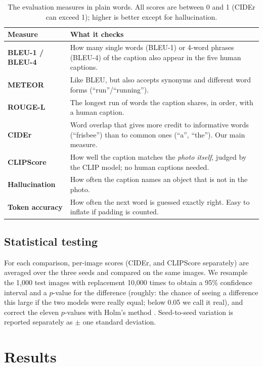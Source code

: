 \documentclass[11pt]{article}
\newcommand{\tbl}[2]{\caption{#1}{\sffamily\small #2}}
\begin{document}
\begin{table}[tbp]\centering
\tbl{The evaluation measures in plain words. All scores are between 0 and 1 (CIDEr can exceed 1); higher is better except for hallucination.}
{\begin{tabularx}{\textwidth}{@{}>{\bfseries}lX@{}}\toprule
Measure & What it checks\\\midrule
BLEU-1 / BLEU-4 & How many single words (BLEU-1) or 4-word phrases (BLEU-4) of the caption also appear in the five human captions.\\
METEOR & Like BLEU, but also accepts synonyms and different word forms (``run''/``running'').\\
ROUGE-L & The longest run of words the caption shares, in order, with a human caption.\\
CIDEr & Word overlap that gives more credit to informative words (``frisbee'') than to common ones (``a'', ``the''). Our main measure.\\
CLIPScore & How well the caption matches the \emph{photo itself}, judged by the CLIP model; no human captions needed.\\
Hallucination & How often the caption names an object that is not in the photo.\\
Token accuracy & How often the next word is guessed exactly right. Easy to inflate if padding is counted.\\\bottomrule
\end{tabularx}}
\label{tab:glossary}
\end{table}

\subsection{Statistical testing}
For each comparison, per-image scores (CIDEr, and CLIPScore separately) are averaged over the three seeds and compared on the same images. We resample the 1,000 test images with replacement 10,000 times \cite{koehn2004,dror2018} to obtain a 95\% confidence interval and a $p$-value for the difference (roughly: the chance of seeing a difference this large if the two models were really equal; below 0.05 we call it real), and correct the eleven $p$-values with Holm's method \cite{holm1979}. Seed-to-seed variation is reported separately as $\pm$ one standard deviation.

\section{Results}\label{sec:results}
\end{document}
